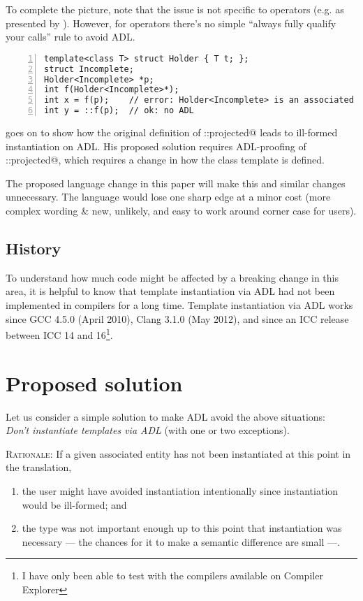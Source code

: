 To complete the picture, note that the issue is not specific to operators (e.g. 
 as presented by \textcite{P2538R0}). However, for operators there's no 
simple “always fully qualify your calls” rule to avoid ADL.
\begin{lstlisting}[style=Vc,numbers=left,float={hbtp},label=lst:example2,caption={
Minimal example triggering ill-formed instantiation
}]
template<class T> struct Holder { T t; };
struct Incomplete;
Holder<Incomplete> *p;
int f(Holder<Incomplete>*);
int x = f(p);    // error: Holder<Incomplete> is an associated entity
int y = ::f(p);  // ok: no ADL
\end{lstlisting}

\textcite{P2538R0} goes on to show how the original definition of \codelst@std::projected@ 
leads to ill-formed instantiation on ADL. His proposed solution requires ADL-proofing of 
\codelst@std::projected@, which requires a change in how the class template is defined.

The proposed language change in this paper will make this and similar changes unnecessary. 
The language would lose one sharp edge at a minor cost (more complex wording \& new, 
unlikely, and easy to work around corner case for users).

\subsection{History}

To understand how much code might be affected by a breaking change in this area, it is 
helpful to know that template instantiation via ADL had not been implemented in compilers 
for a long time. Template instantiation via ADL works since GCC 4.5.0 (April 2010), Clang 
3.1.0 (May 2012), and since an ICC release between ICC 14 and 16\footnote{I have only been 
  able to test with the compilers available on Compiler Explorer}.


\section{Proposed solution}

Let us consider a simple solution to make ADL avoid the above situations:\\
\emph{Don't instantiate templates via ADL} (with one or two exceptions).

\textsc{Rationale:} If a given associated entity has not been instantiated at this point 
in the translation,
\begin{enumerate}
\item the user might have avoided instantiation intentionally since instantiation would be 
ill-formed; and
\item the type was not important enough up to this point that instantiation was necessary 
--- the chances for it to make a semantic difference are small ---.
\end{enumerate}

